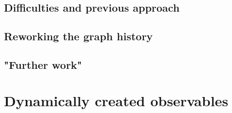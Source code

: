 	\subsection{Difficulties and previous approach}
	
	\subsection{Reworking the graph history}
	
	
	\subsection{"Further work"}
	
	

\section{Dynamically created observables}

